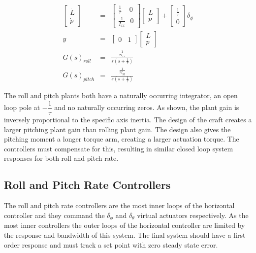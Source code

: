 	\begin{eqnarray}
	\begin{bmatrix} \dot{L} \\ \dot{p}	\end{bmatrix}&=&\begin{bmatrix}\frac{1}{\tau}\ \ \ \ \ 0\\\frac{1}{I_{xx}} \ \ \ 0 \end{bmatrix} \begin{bmatrix} L \\ p \end{bmatrix} + \begin{bmatrix}\frac{1}{\tau}\\ 0 \end{bmatrix} \delta_\phi\label{EQ_RollStateSpace1}\\\label{EQ_RollStateSpace11} 
	y &=& \begin{bmatrix} 0 \ \ \ \ 1 \end{bmatrix} \begin{bmatrix} L \\ p \end{bmatrix} \label{EQ_RollStateSpace2}\\
	G(s)_{roll} &=& \frac{\frac{1}{\tau I_{xx}}}{s (s + \frac{1}{\tau})}\label{EQ_RollTF}\\
	G(s)_{pitch} &=& \frac{\frac{1}{\tau I_{yy}}}{s (s + \frac{1}{\tau})}\label{EQ_PitchTF}
	\end{eqnarray}
	
	The roll and pitch plants both have a naturally occurring integrator, an open loop pole at $-\dfrac{1}{\tau}$ and no naturally occurring zeros. As shown, the plant gain is inversely proportional to the specific axis inertia. The design of the craft creates a larger pitching plant gain than rolling plant gain. The design also gives the pitching moment a longer torque arm, creating a larger actuation torque. The controllers must compensate for this, resulting in similar closed loop system responses for both roll and pitch rate.
	
	\subsection{Roll and Pitch Rate Controllers}
	The roll and pitch rate controllers are the most inner loops of the horizontal controller and they command the $\delta_\phi$ and $\delta_\theta$ virtual actuators respectively. As the most inner controllers the outer loops of the horizontal controller are limited by the response and bandwidth of this system. The final system should have a first order response and must track a set point with zero steady state error.
	
